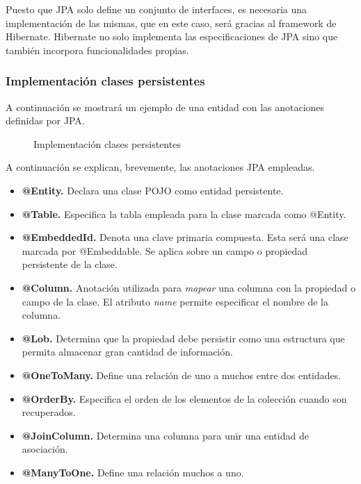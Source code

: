 Puesto que JPA solo define un conjunto de interfaces, es necesaria una implementación de las mismas, que en este caso, será gracias al framework de Hibernate. Hibernate no solo implementa las especificaciones de JPA sino que también incorpora funcionalidades propias.


\subsubsection*{Implementación clases persistentes}
A continuación se mostrará un ejemplo de una entidad con las anotaciones definidas por JPA.

\begin{figure}[H]
\centering
{}
\caption{Implementación clases persistentes}
\end{figure}

A continuación se explican, brevemente, las anotaciones JPA empleadas.

\begin{itemize}
	\item \textbf{@Entity. }Declara una clase POJO como entidad persistente. 
	\item \textbf{@Table. }Especifica la tabla empleada para la clase marcada como @Entity. 
	\item \textbf{@EmbeddedId. }Denota una clave primaria compuesta. Esta será una clase marcada por @Embeddable. Se aplica sobre un campo o propiedad persistente de la clase.
	\item \textbf{@Column. }Anotación utilizada para \textit{mapear} una columna con la propiedad o campo de la clase. El atributo \textit{name} permite especificar el nombre de la columna.
	\item \textbf{@Lob. }Determina que la propiedad debe persistir como una estructura que permita almacenar gran cantidad de información.
	\item \textbf{@OneToMany. }Define una relación de uno a muchos entre dos entidades. 
	\item \textbf{@OrderBy. }Especifica el orden de los elementos de la colección cuando son recuperados.
	\item \textbf{@JoinColumn. }Determina una columna para unir una entidad de asociación.
	\item \textbf{@ManyToOne. }Define una relación muchos a uno.
\end{itemize}



